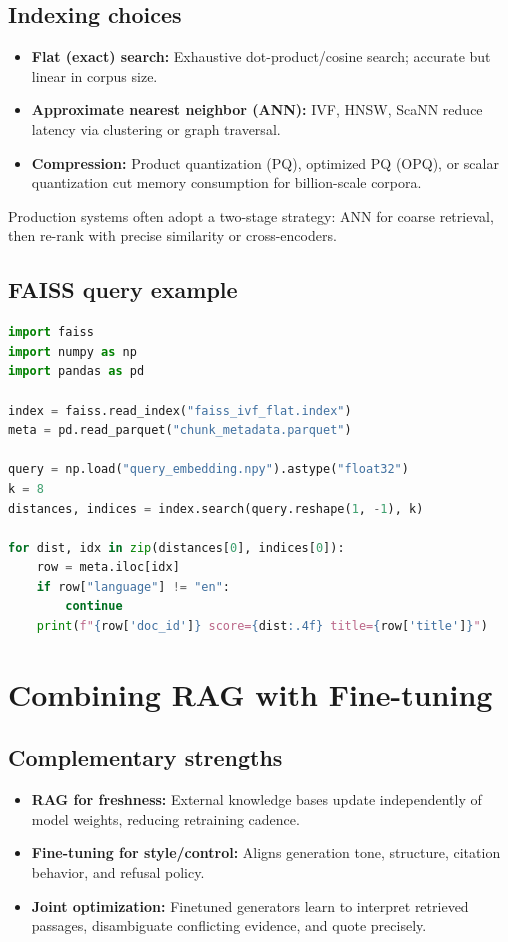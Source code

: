 \documentclass{article}
\begin{document}
\subsection{Indexing choices}
\begin{itemize}
  \item \textbf{Flat (exact) search:} Exhaustive dot-product/cosine search; accurate but linear in corpus size.
  \item \textbf{Approximate nearest neighbor (ANN):} IVF, HNSW, ScaNN reduce latency via clustering or graph traversal.
  \item \textbf{Compression:} Product quantization (PQ), optimized PQ (OPQ), or scalar quantization cut memory consumption for billion-scale corpora.
\end{itemize}
Production systems often adopt a two-stage strategy: ANN for coarse retrieval, then re-rank with precise similarity or cross-encoders.

\subsection{FAISS query example}
\begin{lstlisting}[language=Python,caption={Hybrid FAISS search with metadata filtering}]
import faiss
import numpy as np
import pandas as pd

index = faiss.read_index("faiss_ivf_flat.index")
meta = pd.read_parquet("chunk_metadata.parquet")

query = np.load("query_embedding.npy").astype("float32")
k = 8
distances, indices = index.search(query.reshape(1, -1), k)

for dist, idx in zip(distances[0], indices[0]):
    row = meta.iloc[idx]
    if row["language"] != "en":
        continue
    print(f"{row['doc_id']} score={dist:.4f} title={row['title']}")
\end{lstlisting}

\section{Combining RAG with Fine-tuning}
\subsection{Complementary strengths}
\begin{itemize}
  \item \textbf{RAG for freshness:} External knowledge bases update independently of model weights, reducing retraining cadence.
  \item \textbf{Fine-tuning for style/control:} Aligns generation tone, structure, citation behavior, and refusal policy.
  \item \textbf{Joint optimization:} Finetuned generators learn to interpret retrieved passages, disambiguate conflicting evidence, and quote precisely.
\end{itemize}
\end{document}
